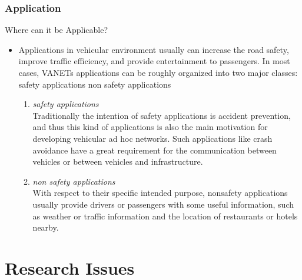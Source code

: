 \documentclass{beamer}
\begin{document}
\begin{frame}
	\frametitle{Application}
	\begin{block}{Where can it be Applicable?}
		\begin{itemize}
			\item Applications in vehicular environment usually can increase the road safety, improve traffic efficiency, and provide entertainment to passengers. In most cases, VANETs applications can be roughly organized into two major classes:
			safety applications
			non safety applications
			\begin{enumerate}
			\item \textit{safety applications}\\
			Traditionally the intention of safety applications is accident prevention, and thus this kind of applications is also the main motivation for developing vehicular ad hoc networks. 
			Such applications like crash avoidance have a great requirement for the communication between vehicles or between vehicles and infrastructure.
			
			
			\item \textit{non safety applications}\\
			With respect to their specific intended purpose, nonsafety applications usually provide drivers or passengers with some useful information, such as weather or traffic information and the location of restaurants or hotels nearby.
			
			\end{enumerate}
			
			
		\end{itemize}
	\end{block}
\end{frame}

\section{Research Issues}
\end{document}

